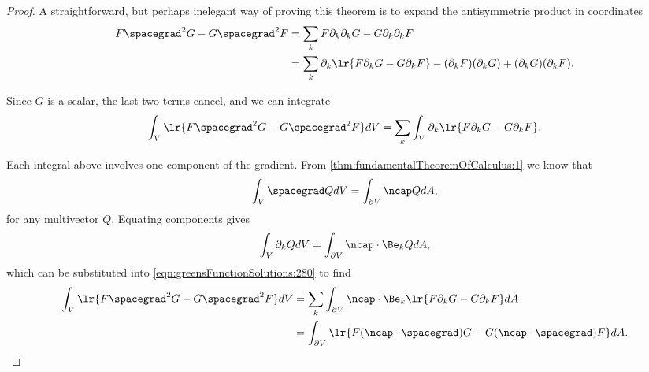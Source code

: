 \begin{proof}
A straightforward, but perhaps inelegant way of proving this theorem is to expand the antisymmetric product in coordinates
\begin{equation}\label{eqn:greensFunctionSolutions:260}
\begin{aligned}
F \spacegrad^2 G - G \spacegrad^2 F
&= \sum_k F \partial_k \partial_k G - G \partial_k \partial_k F \\
&= \sum_k \partial_k \lr{ F \partial_k G - G \partial_k F } - (\partial_k F)(\partial_k G) + (\partial_k G)(\partial_k F).
\end{aligned}
\end{equation}

Since \( G \) is a scalar, the last two terms cancel, and we can integrate
\begin{equation}\label{eqn:greensFunctionSolutions:280}
\int_V \lr{ F \spacegrad^2 G - G \spacegrad^2 F } dV
=
\sum_k \int_V \partial_k \lr{ F \partial_k G - G \partial_k F }.
\end{equation}

Each integral above involves one component of the gradient.
From
\cref{thm:fundamentalTheoremOfCalculus:1}
we know that
\begin{equation}\label{eqn:greensFunctionSolutions:300}
\int_V \spacegrad Q dV = \int_{\partial V} \ncap Q dA,
\end{equation}
for any multivector \( Q \).
Equating components gives
\begin{equation}\label{eqn:greensFunctionSolutions:460}
\int_V \partial_k Q dV = \int_{\partial V} \ncap \cdot \Be_k Q dA,
\end{equation}
which can be substituted into \cref{eqn:greensFunctionSolutions:280} to find
\begin{equation}\label{eqn:greensFunctionSolutions:480}
\begin{aligned}
\int_V \lr{ F \spacegrad^2 G - G \spacegrad^2 F } dV
&= \sum_k \int_{\partial V} \ncap \cdot \Be_k \lr{ F \partial_k G - G \partial_k F } dA \\
&= \int_{\partial V} \lr{ F (\ncap \cdot \spacegrad) G - G (\ncap \cdot \spacegrad) F } dA.
\end{aligned}
\end{equation}
\end{proof}

